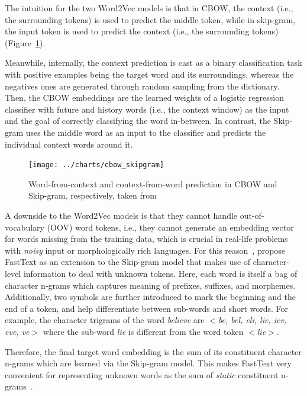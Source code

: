 The intuition for the two Word2Vec models is that in CBOW, the context (i.e., the surrounding tokens) is used to predict the middle token, while in skip-gram, the input token is used to predict the context (i.e., the surrounding tokens) (Figure~\ref{fig:cbow_skipgram}).

Meanwhile, internally, the context prediction is cast as a binary classification task with positive examples being the target word and its surroundings, whereas the negatives ones are generated through random sampling from the dictionary.
Then, the CBOW embeddings are the learned weights of a logistic regression classifier with future and history words (i.e., the context window) as the input and the goal of correctly classifying the word in-between.
In contrast, the Skip-gram uses the middle word as an input to the classifier and predicts the individual context words around it.

\begin{figure}[ht]
    \centering
    \texttt{[image: ../charts/cbow\_skipgram]}~\caption{Word-from-context and context-from-word prediction in CBOW and Skip-gram, respectively, taken from~\cite{mikolov2013efficient}}
    \label{fig:cbow_skipgram}
\end{figure}

A downside to the Word2Vec models is that they cannot handle out-of-vocabulary (OOV) word tokens, i.e., they cannot generate an embedding vector for words missing from the training data, which is crucial in real-life problems with \emph{noisy} input or morphologically rich languages.
For this reason~\cite{bojanowski-etal-2017-enriching}, propose FastText as an extension to the Skip-gram model that makes use of character-level information to deal with unknown tokens.
Here, each word is itself a bag of character n-grams which captures meaning of prefixes, suffixes, and morphemes.
Additionally, two symbols are further introduced to mark the beginning and the end of a token, and help differentiate between sub-words and short words.
For example, the character trigrams of the word \emph{believe} are \emph{$<$be, bel, eli, lie, iev, eve, ve$>$} where the sub-word \emph{lie} is different from the word token \emph{$<$lie$>$}.

Therefore, the final target word embedding is the sum of its constituent character n-grams which are learned via the Skip-gram model.
This makes FastText very convenient for representing unknown words as the sum of \emph{static} constituent n-grams~\cite{jurafsky2000}.

